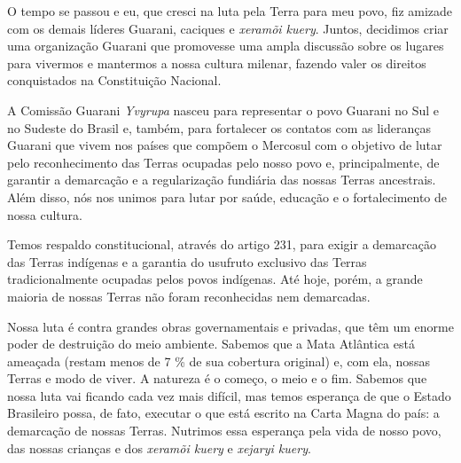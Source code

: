 
 


 

O tempo se passou e eu, que cresci na luta pela Terra para meu povo, fiz
amizade com os demais líderes Guarani, caciques e \emph{xeramõi kuery}.
Juntos, decidimos criar uma organização Guarani que promovesse uma ampla
discussão sobre os lugares para vivermos e mantermos a nossa cultura
milenar, fazendo valer os direitos conquistados na Constituição
Nacional.

A Comissão Guarani \emph{Yvyrupa} nasceu para representar o povo Guarani
no Sul e no Sudeste do Brasil e, também, para fortalecer os contatos com
as lideranças Guarani que vivem nos países que compõem o Mercosul com o
objetivo de lutar pelo reconhecimento das Terras ocupadas pelo nosso
povo e, principalmente, de garantir a demarcação e a regularização
fundiária das nossas Terras ancestrais. Além disso, nós nos unimos para
lutar por saúde, educação e o fortalecimento de nossa cultura.

Temos respaldo constitucional, através do artigo 231, para exigir a
demarcação das Terras indígenas e a garantia do usufruto exclusivo das
Terras tradicionalmente ocupadas pelos povos indígenas. Até hoje, porém,
a grande maioria de nossas Terras não foram reconhecidas nem demarcadas.

Nossa luta é contra grandes obras governamentais e privadas, que têm um
enorme poder de destruição do meio ambiente. Sabemos que a Mata
Atlântica está ameaçada (restam menos de 7 \% de sua cobertura original)
e, com ela, nossas Terras e modo de viver. A natureza é o começo, o meio
e o fim. Sabemos que nossa luta vai ficando cada vez mais difícil, mas
temos esperança de que o Estado Brasileiro possa, de fato, executar o
que está escrito na Carta Magna do país: a demarcação de nossas Terras.
Nutrimos essa esperança pela vida de nosso povo, das nossas crianças e
dos \emph{xeramõi kuery} e \emph{xejaryi kuery}.

 

 
